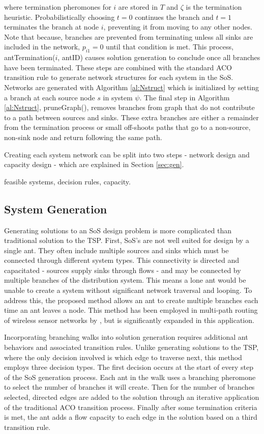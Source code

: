 \documentclass[preprint,12pt]{elsarticle}
\begin{document}
\noindent where termination pheromones for $i$ are stored in $T$ and $\zeta$ is the termination heuristic. Probabilistically choosing $t=0$ continues the branch and $t=1$ terminates the branch at node $i$, preventing it from moving to any other nodes. Note that because, branches are prevented from terminating unless all sinks are included in the network, $p_{i1}=0$ until that condition is met. This process, antTermination($i$, antID) causes solution generation to conclude once all branches have been terminated. These steps are combined with the standard ACO transition rule to generate network structures for each system in the SoS. Networks are generated with Algorithm \ref{al:Nstruct} which is initialized by setting a branch at each source node $s$ in system $\psi$. The final step in Algorithm \ref{al:Nstruct}, pruneGraph(), removes branches from graph that do not contribute to a path between sources and sinks. These extra branches are either a remainder from the termination process or small off-shoots paths that go to a non-source, non-sink node and return following the same path. 

Creating each system network can be split into two steps -  network design and capacity design - which are explained in Section \ref{sec:gen}. 

feasible systems, decision rules, capacity.


\subsection{System Generation} \label{sec:trans}
Generating solutions to an SoS design problem is more complicated than traditional solution to the TSP. First, SoS's are not well suited for design by a single ant. They often include multiple sources and sinks which must be connected through different system types. This connectivity is directed and capacitated - sources supply sinks through flows - and may be connected by multiple branches of the distribution system. This means a lone ant would be unable to create a system without significant network traversal and looping. To address this, the proposed method allows an ant to create multiple branches each time an ant leaves a node. This method has been employed in multi-path routing of wireless sensor networks by \cite{Yang2010}, but is significantly expanded in this application. 

Incorporating branching walks into solution generation requires additional ant behaviors and associated transition rules. Unlike generating solutions to the TSP, where the only decision involved is which edge to traverse next, this method employs three decision types. The first decision occurs at the start of every step of the SoS generation process. Each ant in the walk uses a branching pheromone to select the number of branches it will create. Then for the number of branches selected, directed edges are added to the solution through an iterative application of the traditional ACO transition process. Finally after some termination criteria is met, the ant adds a flow capacity to each edge in the solution based on a third transition rule.
\end{document}
